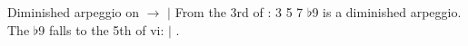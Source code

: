 \begin{patternbox}{Diminished arpeggio on  $\to$ }{ $|$ }
From the 3rd of : 3 5 7 $\flat$9 is a diminished arpeggio. The $\flat$9 falls
to the 5th of vi:
 $|$ .
\patternwhereline
\end{patternbox}
